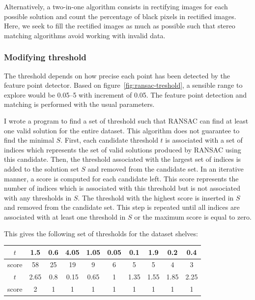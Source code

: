 \documentclass[11pt]{report}
\begin{document}
Alternatively, a two-in-one algorithm consists in rectifying images for each possible solution and count the percentage of black pixels in rectified images. Here, we seek to fill the rectified images as much as possible such that stereo matching algorithms avoid working with invalid data.

\subsubsection{Modifying threshold}

The threshold depends on how precise each point has been detected by the feature point detector. Based on figure~\ref{fig:ransac-treshold}, a sensible range to explore would be 0.05--5 with increment of 0.05. The feature point detection and matching is performed with the usual parameters.

I wrote a program to find a set of threshold such that RANSAC can find at least one valid solution for the entire dataset. This algorithm does not guarantee to find the minimal $S$. First, each candidate threshold $t$ is associated with a set of indices which represents the set of valid solutions produced by RANSAC using this candidate. Then, the threshold associated with the largest set of indices is added to the solution set $S$ and removed from the candidate set. In an iterative manner, a score is computed for each candidate left. This score represents the number of indices which is associated with this threshold but is not associated with any thresholds in $S$. The threshold with the highest score is inserted in $S$ and removed from the candidate set. This step is repeated until all indices are associated with at least one threshold in $S$ or the maximum score is equal to zero.

This gives the following set of thresholds for the dataset shelves:
\begin{center}
\begin{tabular}{|c|c|c|c|c|c|c|c|c|c|}
\hline
$t$ & 1.5 & 0.6 & 4.05 & 1.05 & 0.05 & 0.1 & 1.9 & 0.2 & 0.4  \\
\hline
score & 58 & 25 & 19 & 9 & 6 & 5 & 5 & 4 & 3 \\
\hline
$t$ & 2.65 & 0.8 & 0.15 & 0.65 & 1 & 1.35 & 1.55 & 1.85 & 2.25 \\
\hline
score & 2 & 1 & 1 & 1 & 1 & 1 & 1 & 1 & 1\\
\hline
\end{tabular}
\end{center}
\end{document}
